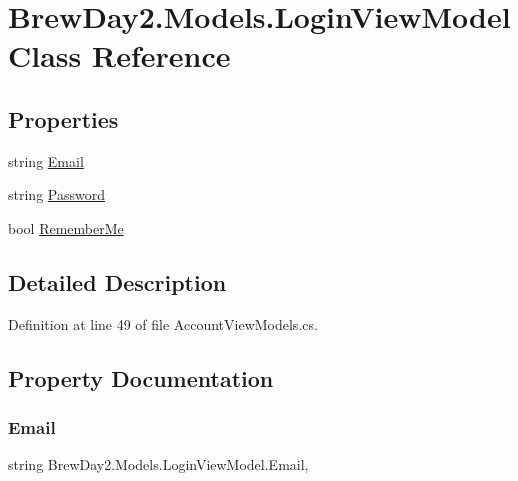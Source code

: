 \hypertarget{class_brew_day2_1_1_models_1_1_login_view_model}{}\section{Brew\+Day2.\+Models.\+Login\+View\+Model Class Reference}
\label{class_brew_day2_1_1_models_1_1_login_view_model}
\subsection*{Properties}
\begin{DoxyCompactItemize}
\item 
string \mbox{\hyperlink{class_brew_day2_1_1_models_1_1_login_view_model_a07e3a04a8bb8a5032f963566f0aa282f}{Email}}
\item 
string \mbox{\hyperlink{class_brew_day2_1_1_models_1_1_login_view_model_aafcc3b27203de42fa31d7eff0880e24f}{Password}}
\item 
bool \mbox{\hyperlink{class_brew_day2_1_1_models_1_1_login_view_model_a3decffd7d74955bc298602d484d93e5a}{Remember\+Me}}
\end{DoxyCompactItemize}


\subsection{Detailed Description}


Definition at line 49 of file Account\+View\+Models.\+cs.



\subsection{Property Documentation}
\mbox{\label{class_brew_day2_1_1_models_1_1_login_view_model_a07e3a04a8bb8a5032f963566f0aa282f}} 
\subsubsection{\texorpdfstring{Email}{Email}}
{\footnotesize\ttfamily string Brew\+Day2.\+Models.\+Login\+View\+Model.\+Email\hspace{0.3cm}{\ttfamily [get]}, {\ttfamily [set]}}



